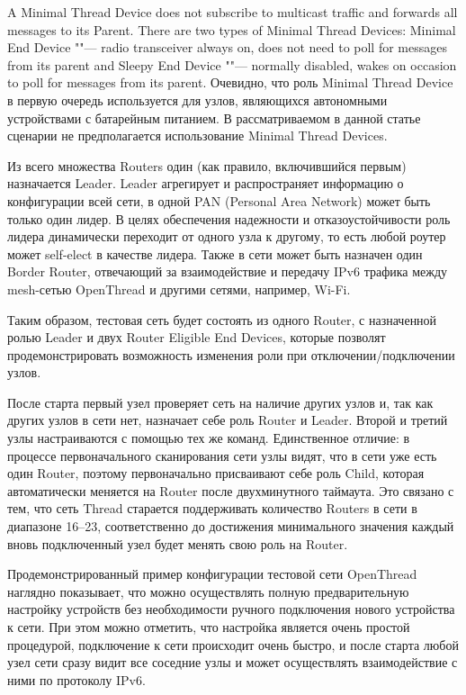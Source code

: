 A Minimal Thread Device does not subscribe to multicast traffic and forwards all messages to its Parent. There are two types of Minimal Thread Devices: Minimal End Device ""--- radio transceiver always on, does not need to poll for messages from its parent and Sleepy End Device ""--- normally disabled, wakes on occasion to poll for messages from its parent. Очевидно, что роль Minimal Thread Device в первую очередь используется для узлов, являющихся автономными устройствами с батарейным питанием. В рассматриваемом в данной статье сценарии не предполагается использование Minimal Thread Devices. 

Из всего множества Routers один (как правило, включившийся первым) назначается Leader. Leader агрегирует и распространяет информацию о конфигурации всей сети, в одной PAN (Personal Area Network) может быть только один лидер.  В целях обеспечения надежности и отказоустойчивости роль лидера динамически переходит от одного узла к другому, то есть любой роутер может self-elect в качестве лидера. Также в сети может быть назначен один Border Router, отвечающий за взаимодействие и передачу IPv6 трафика между mesh-сетью OpenThread и другими сетями, например, Wi-Fi.

Таким образом, тестовая сеть будет состоять из одного Router, с назначенной ролью Leader и двух Router Eligible End Devices, которые позволят продемонстрировать возможность изменения роли при отключении/подключении узлов.

После старта первый узел проверяет сеть на наличие других узлов и, так как других узлов в сети нет, назначает себе роль Router и Leader. Второй и третий узлы настраиваются с помощью тех же команд. Единственное отличие: в процессе первоначального сканирования сети узлы видят, что в сети уже есть один Router, поэтому первоначально присваивают себе роль Child, которая автоматически меняется на Router после двухминутного таймаута. Это связано с тем, что сеть Thread старается поддерживать количество Routers в сети в диапазоне 16--23, соответственно до достижения минимального значения каждый вновь подключенный узел будет менять свою роль на Router.

Продемонстрированный пример конфигурации тестовой сети OpenThread наглядно показывает, что можно осуществлять полную предварительную настройку устройств без необходимости ручного подключения нового устройства к сети. При этом можно отметить, что настройка является очень простой процедурой, подключение к сети происходит очень быстро, и после старта любой узел сети сразу видит все соседние узлы и может осуществлять взаимодействие с ними по протоколу IPv6.

